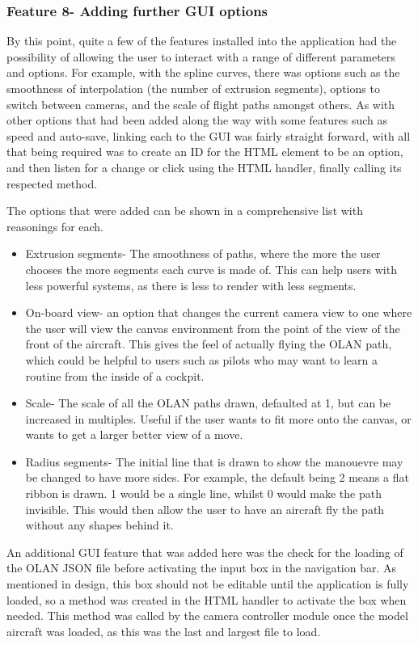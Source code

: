 \subsubsection{Feature 8- Adding further GUI options}
By this point, quite a few of the features installed into the application had the possibility of allowing the user to interact with a range of different parameters and options. For example, with the spline curves, there was options such as the smoothness of interpolation (the number of extrusion segments), options to switch between cameras, and the scale of flight paths amongst others. As with other options that had been added along the way with some features such as speed and auto-save, linking each to the GUI was fairly straight forward, with all that being required was to create an ID for the HTML element to be an option, and then listen for a change or click using the HTML handler, finally calling its respected method.  

The options that were added can be shown in a comprehensive list with reasonings for each.
\begin{itemize}
	\item Extrusion segments- The smoothness of paths, where the more the user chooses the more segments each curve is made of. This can help users with less powerful systems, as there is less to render with less segments.
	\item On-board view- an option that changes the current camera view to one where the user will view the canvas environment from the point of the view of the front of the aircraft. This gives the feel of actually flying the OLAN path, which could be helpful to users such as pilots who may want to learn a routine from the inside of a cockpit.
	\item Scale- The scale of all the OLAN paths drawn, defaulted at 1, but can be increased in multiples. Useful if the user wants to fit more onto the canvas, or wants to get a larger better view of a move.
	\item Radius segments- The initial line that is drawn to show the manouevre may be changed to have more sides. For example, the default being 2 means a flat ribbon is drawn. 1 would be a single line, whilst 0 would make the path invisible. This would then allow the user to have an aircraft fly the path without any shapes behind it.
\end{itemize}

An additional GUI feature that was added here was the check for the loading of the OLAN JSON file before activating the input box in the navigation bar. As mentioned in design, this box should not be editable until the application is fully loaded, so a method was created in the HTML handler to activate the box when needed. This method was called by the camera controller module once the model aircraft was loaded, as this was the last and largest file to load.

